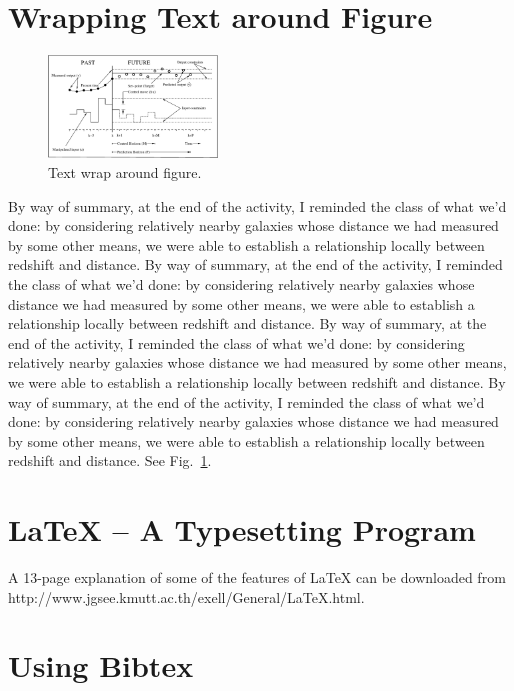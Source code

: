 \section{Wrapping Text around Figure}


\renewcommand{\baselinestretch}{1}
\begin{figure}
\includegraphics[width=0.4\textwidth]{mpc.eps}
\caption{ Text wrap around figure. \label{fig:test}}
\end{figure}

\renewcommand{\baselinestretch}{2}
\large\normalsize

By way of summary, at the end of the activity, I reminded the class of what we'd done:  by considering relatively nearby galaxies whose distance we had measured by some other means, we were able to establish a relationship locally between redshift and distance.  
By way of summary, at the end of the activity, I reminded the class of what we'd done:  by considering relatively nearby galaxies whose distance we had measured by some other means, we were able to establish a relationship locally between redshift and distance.  
By way of summary, at the end of the activity, I reminded the class of what we'd done:  by considering relatively nearby galaxies whose distance we had measured by some other means, we were able to establish a relationship locally between redshift and distance.  
By way of summary, at the end of the activity, I reminded the class of what we'd done:  by considering relatively nearby galaxies whose distance we had measured by some other means, we were able to establish a relationship locally between redshift and distance.  See Fig.~\ref{fig:test}.


\section{LaTeX -- A Typesetting Program}

A 13-page explanation of some of the features of LaTeX can be downloaded from http://www.jgsee.kmutt.ac.th/exell/General/LaTeX.html.


\section{Using Bibtex}

